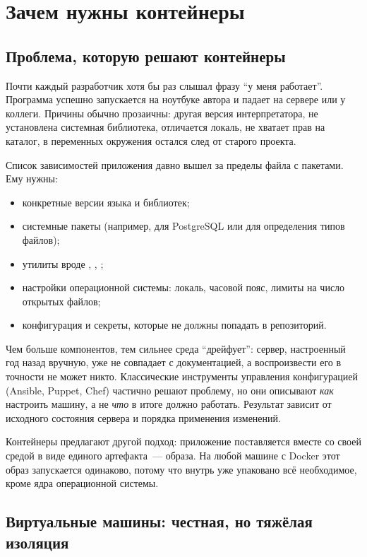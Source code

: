 \chapter{Зачем нужны контейнеры}

\section{Проблема, которую решают контейнеры}

Почти каждый разработчик хотя бы раз слышал фразу \enquote{у меня работает}.
Программа успешно запускается на ноутбуке автора и падает на сервере
или у коллеги. Причины обычно прозаичны: другая версия интерпретатора,
не установлена системная библиотека, отличается локаль, не хватает прав
на каталог, в переменных окружения остался след от старого проекта.

Список зависимостей приложения давно вышел за пределы файла с пакетами.
Ему нужны:

\begin{itemize}
  \item конкретные версии языка и библиотек;
  \item системные пакеты (например,  для PostgreSQL
        или  для определения типов файлов);
  \item утилиты вроде , , ;
  \item настройки операционной системы: локаль, часовой пояс, лимиты
        на число открытых файлов;
  \item конфигурация и секреты, которые не должны попадать в репозиторий.
\end{itemize}

Чем больше компонентов, тем сильнее среда \enquote{дрейфует}: сервер,
настроенный год назад вручную, уже не совпадает с документацией,
а воспроизвести его в точности не может никто. Классические инструменты
управления конфигурацией (Ansible, Puppet, Chef) частично решают проблему,
но они описывают \emph{как} настроить машину, а не \emph{что} в итоге
должно работать. Результат зависит от исходного состояния сервера
и порядка применения изменений.

Контейнеры предлагают другой подход: приложение поставляется вместе
со своей средой в виде единого артефакта~--- образа. На любой машине
с Docker этот образ запускается одинаково, потому что внутрь уже упаковано
всё необходимое, кроме ядра операционной системы.

\section{Виртуальные машины: честная, но тяжёлая изоляция}

